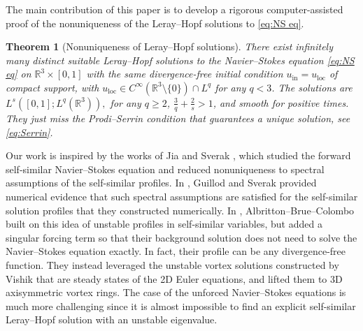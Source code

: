 \documentclass[11pt,a4paper]{article}
\numberwithin{equation}{section}
\newcommand{\yw}[1]{\textcolor{blue}{#1}}
\newcommand{\tmop}[1]{\ensuremath{\operatorname{#1}}}
\newtheorem{theorem}{Theorem}
\begin{document}
The main contribution of this paper is to develop a rigorous computer-assisted proof of the nonuniqueness of the
Leray--Hopf solutions to \eqref{eq:NS eq}.
\begin{theorem}[Nonuniqueness of
Leray--Hopf solutions]
  \label{thm:main}There exist infinitely many distinct suitable Leray--Hopf
  solutions to the Navier--Stokes equation \eqref{eq:NS eq} on $\mathbb{R}^3
  \times [0, 1]$ with the same divergence-free initial condition $u_{\tmop{in}} =u_{\tmop{loc}}$ of compact support, with $u_{\tmop{loc}}\in C^\infty(\mathbb{R}^3\setminus\{0\})\cap L^q$ for any $q<3$. The solutions are $ L^s ([0, 1] ; L^q (\mathbb{R}^3)),$ for any $q\geqslant2$, $\frac{3}{q} + \frac{2}{s}
> 1$, {and smooth for positive times}. They just miss the Prodi--Serrin condition that guarantees a unique solution, see \eqref{eq:Serrin}.
\end{theorem}
Our work is inspired by the works of Jia and Sverak \cite{jia2014local,jia2015incompressible}, which studied the forward self-similar Navier--Stokes equation and reduced nonuniqueness to spectral assumptions of the self-similar profiles. In \cite{guillod2023numerical}, Guillod and Sverak provided numerical evidence that such spectral assumptions are satisfied for the self-similar solution profiles that they constructed numerically. In \cite{albritton2022non}, Albritton--Brue--Colombo built on this idea of unstable profiles in self-similar variables, but added a singular forcing term so that their background solution does not need to solve the Navier--Stokes equation exactly. In fact, their profile can be any divergence-free function. They instead leveraged the unstable vortex solutions constructed by Vishik \cite{vishik2018instability,vishik2018instability1,albritton2021instability}
that are steady states of the 2D Euler equations, and lifted them to 3D axisymmetric vortex rings. The case of the unforced Navier--Stokes equations is much more challenging since it is almost impossible to find an explicit self-similar Leray--Hopf solution with an unstable eigenvalue. 
\end{document}
